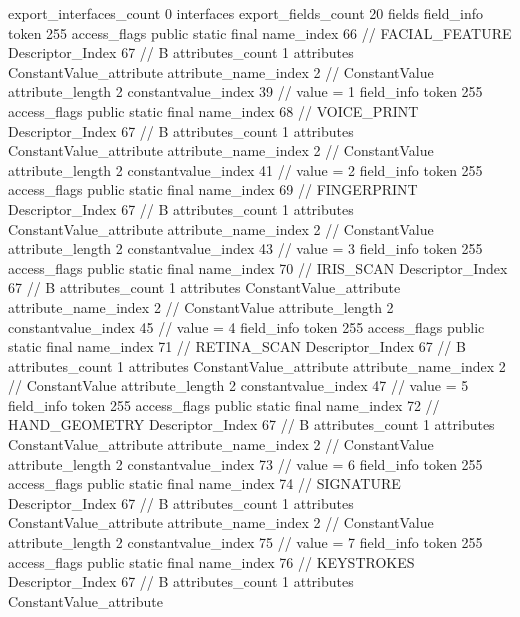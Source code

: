 {{{{			}
			export_interfaces_count	0
			interfaces {
			}
			export_fields_count	20
			fields {
			field_info {
				token	255
				access_flags	public static final
				name_index	66		// FACIAL_FEATURE
				Descriptor_Index	67		// B
				attributes_count	1
				attributes {
				ConstantValue_attribute {
					attribute_name_index	2		// ConstantValue
					attribute_length	2
					constantvalue_index	39		// value = 1
				}
				}
			}
			field_info {
				token	255
				access_flags	public static final
				name_index	68		// VOICE_PRINT
				Descriptor_Index	67		// B
				attributes_count	1
				attributes {
				ConstantValue_attribute {
					attribute_name_index	2		// ConstantValue
					attribute_length	2
					constantvalue_index	41		// value = 2
				}
				}
			}
			field_info {
				token	255
				access_flags	public static final
				name_index	69		// FINGERPRINT
				Descriptor_Index	67		// B
				attributes_count	1
				attributes {
				ConstantValue_attribute {
					attribute_name_index	2		// ConstantValue
					attribute_length	2
					constantvalue_index	43		// value = 3
				}
				}
			}
			field_info {
				token	255
				access_flags	public static final
				name_index	70		// IRIS_SCAN
				Descriptor_Index	67		// B
				attributes_count	1
				attributes {
				ConstantValue_attribute {
					attribute_name_index	2		// ConstantValue
					attribute_length	2
					constantvalue_index	45		// value = 4
				}
				}
			}
			field_info {
				token	255
				access_flags	public static final
				name_index	71		// RETINA_SCAN
				Descriptor_Index	67		// B
				attributes_count	1
				attributes {
				ConstantValue_attribute {
					attribute_name_index	2		// ConstantValue
					attribute_length	2
					constantvalue_index	47		// value = 5
				}
				}
			}
			field_info {
				token	255
				access_flags	public static final
				name_index	72		// HAND_GEOMETRY
				Descriptor_Index	67		// B
				attributes_count	1
				attributes {
				ConstantValue_attribute {
					attribute_name_index	2		// ConstantValue
					attribute_length	2
					constantvalue_index	73		// value = 6
				}
				}
			}
			field_info {
				token	255
				access_flags	public static final
				name_index	74		// SIGNATURE
				Descriptor_Index	67		// B
				attributes_count	1
				attributes {
				ConstantValue_attribute {
					attribute_name_index	2		// ConstantValue
					attribute_length	2
					constantvalue_index	75		// value = 7
				}
				}
			}
			field_info {
				token	255
				access_flags	public static final
				name_index	76		// KEYSTROKES
				Descriptor_Index	67		// B
				attributes_count	1
				attributes {
				ConstantValue_attribute {
}}}}}}}
